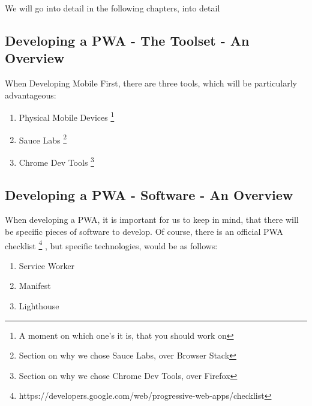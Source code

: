 We will go into detail in the following chapters, into detail
\subsection{ Developing a PWA - The Toolset - An Overview}
When Developing Mobile First, there are three tools, which will be particularly
advantageous:
\begin{enumerate}
  \item Physical Mobile Devices \footnote{A moment on which one's it is, that
  you should work on}
  \item Sauce Labs \footnote{Section on why we chose Sauce Labs, over Browser
  Stack}
  \item Chrome Dev Tools \footnote{Section on why we chose Chrome Dev Tools,
  over Firefox}
\end{enumerate}

\subsection{ Developing a PWA - Software - An Overview}
When developing a PWA, it is important for us to keep in mind, that there will
be specific pieces of software to develop. Of course, there is an official PWA
checklist \footnote{https://developers.google.com/web/progressive-web-apps/checklist}
, but specific technologies, would be as follows: 
\begin{enumerate}
  \item Service Worker
  \item Manifest
  \item Lighthouse
\end{enumerate}
